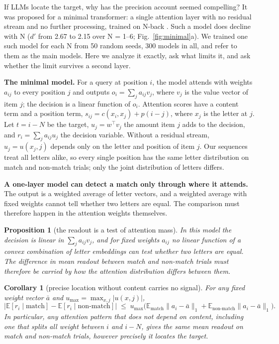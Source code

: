 \documentclass{article}
\newtheorem{proposition}{Proposition}
\newtheorem{corollary}{Corollary}
\newcommand{\dprime}{$d'$}
\begin{document}
If LLMs locate the target, why has the precision account seemed compelling? It was proposed for a minimal transformer: a single attention layer with no residual stream and no further processing, trained on N-back \citep{gong2024selfattention}. Such a model does decline with N (\dprime{} from 2.67 to 2.15 over N = 1--6; Fig.~\ref{fig:minimal}a). We trained one such model for each N from 50 random seeds, 300 models in all, and refer to them as the main models. Here we analyze it exactly, ask what limits it, and ask whether the limit survives a second layer.

\textbf{The minimal model.} For a query at position $i$, the model attends with weights $a_{ij}$ to every position $j$ and outputs $o_i=\sum_j a_{ij}v_j$, where $v_j$ is the value vector of item $j$; the decision is a linear function of $o_i$. Attention scores have a content term and a position term, $s_{ij}=c(x_i,x_j)+p(i-j)$, where $x_j$ is the letter at $j$. Let $t=i-N$ be the target, $u_j=w^\top v_j$ the amount item $j$ adds to the decision, and $r_i=\sum_j a_{ij}u_j$ the decision variable. Without a residual stream, $u_j=u(x_j,j)$ depends only on the letter and position of item $j$. Our sequences treat all letters alike, so every single position has the same letter distribution on match and non-match trials; only the joint distribution of letters differs.

\textbf{A one-layer model can detect a match only through where it attends.} The output is a weighted average of letter vectors, and a weighted average with fixed weights cannot tell whether two letters are equal. The comparison must therefore happen in the attention weights themselves.

\begin{proposition}[the readout is a test of attention mass]\label{prop:mass}
In this model the decision is linear in $\sum_j a_{ij} v_j$, and for fixed weights $a_{ij}$ no linear function of a convex combination of letter embeddings can test whether two letters are equal. The difference in mean readout between match and non-match trials must therefore be carried by how the attention distribution differs between them.
\end{proposition}

\begin{corollary}[precise location without content carries no signal]\label{cor:fixed}
For any fixed weight vector $\bar a$ and $u_{\max}=\max_{x,j}|u(x,j)|$,
\[
\bigl|\mathbb{E}[r_i\mid\text{match}]-\mathbb{E}[r_i\mid\text{non-match}]\bigr|\;\le\;u_{\max}\bigl(\mathbb{E}_{\text{match}}\|a_i-\bar a\|_1+\mathbb{E}_{\text{non-match}}\|a_i-\bar a\|_1\bigr).
\]
In particular, any attention pattern that does not depend on content, including one that splits all weight between $i$ and $i-N$, gives the same mean readout on match and non-match trials, however precisely it locates the target.
\end{corollary}
\end{document}
